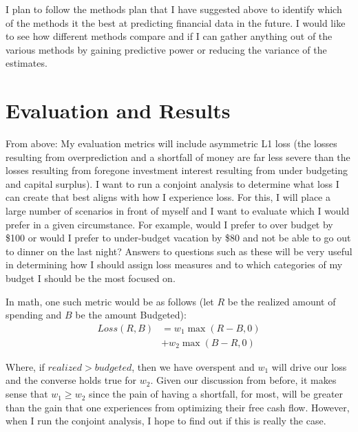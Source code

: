 \documentclass[11pt,a4paper]{article}
\newenvironment{updatematerial}{
\color{blue}
}{

}
\begin{document}
\begin{updatematerial}
	I plan to follow the methods plan that I have suggested above to identify which of the methods it the best at predicting financial data in the future. I would like to see how different methods compare and if I can gather anything out of the various methods by gaining predictive power or reducing the variance of the estimates. 
\end{updatematerial}


\section{Evaluation and Results}

From above: My evaluation metrics will include asymmetric L1 loss (the losses resulting from overprediction and a shortfall of money are far less severe than the losses resulting from foregone investment interest resulting from under budgeting and capital surplus). I want to run a conjoint analysis to determine what loss I can create that best aligns with how I experience loss. For this, I will place a large number of scenarios in front of myself and I want to evaluate which I would prefer in a given circumstance. For example, would I prefer to over budget by \$100 or would I prefer to under-budget vacation by \$80 and not be able to go out to dinner on the last night? Answers to questions such as these will be very useful in determining how I should assign loss measures and to which categories of my budget I should be the most focused on. 

In math, one such metric would be as follows (let $R$ be the realized amount of spending and $B$ be the amount Budgeted):
\begin{align}
Loss(R, B) &= w_1 \max(R - B, 0) \nonumber \\
&+ w_2 \max(B - R, 0)
\end{align}

Where, if $realized > budgeted$, then we have overspent and $w_1$ will drive our loss and the converse holds true for $w_2$. Given our discussion from before, it makes sense that $w_1 \geq w_2$ since the pain of having a shortfall, for most, will be greater than the gain that one experiences from optimizing their free cash flow. However, when I run the conjoint analysis, I hope to find out if this is really the case. 
\end{document}
